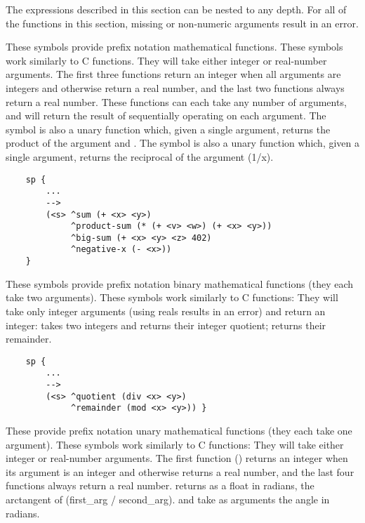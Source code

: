 The expressions described in this section can be nested to any depth. For all of the functions in this section, missing or non-numeric arguments result in an error.


\begin{description}
	
\item [\soarb{+, -, *, /} --- ]
	These symbols provide prefix notation mathematical functions. These symbols work similarly to C functions.  They will take either integer or real-number arguments. The first three functions return an integer when all arguments are integers and otherwise return a real number, and the last two functions always return a real number. These functions can each take any number of arguments, and will return the result of sequentially operating on each argument. The \soar{-} symbol is also a unary function which, given a single argument, returns the product of the argument and .  The \soar{/} symbol is also a unary function which, given a single argument, returns the reciprocal of the argument (1/x).

	\begin{verbatim}
	sp {
	    ...
	    -->
	    (<s> ^sum (+ <x> <y>)
	         ^product-sum (* (+ <v> <w>) (+ <x> <y>))
	         ^big-sum (+ <x> <y> <z> 402)
	         ^negative-x (- <x>))
	}
	\end{verbatim}

\item [\soarb{div, mod} --- ]
	These symbols provide prefix notation binary mathematical functions (they each take two arguments). These symbols work similarly to C functions: They will take only integer arguments (using reals results in an error) and return an integer:  takes two integers and returns their integer quotient;  returns their remainder.

	\begin{verbatim}
	sp {
	    ...
	    -->
	    (<s> ^quotient (div <x> <y>)
	         ^remainder (mod <x> <y>)) }
	\end{verbatim}

\item [\soarb{abs, atan2, sqrt, sin, cos} --- ]   
	These provide prefix notation unary mathematical functions (they each take one argument). These symbols work similarly to C functions: They will take either integer or real-number arguments. The first function () returns an integer when its argument is an integer and otherwise returns a real number, and the last four functions always return a real number.   returns as a float in radians, the arctangent of (first\_arg / second\_arg).  and  take as arguments the angle in radians.


\end{description}
